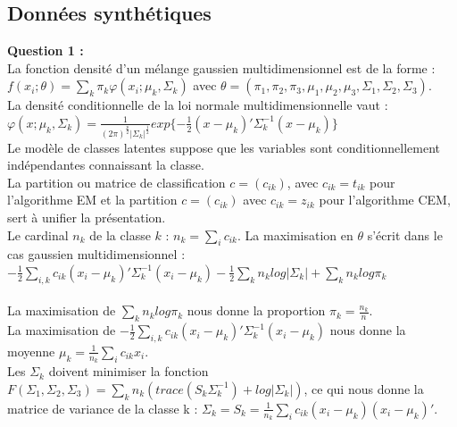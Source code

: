 \documentclass[a4paper, 10pt]{article}
\begin{document}
\subsection*{Données synthétiques}
\textbf{Question 1 :}\\
La fonction densité d'un mélange gaussien multidimensionnel est de la forme :\\
$f(x_{i}; \theta) = \underset{k}{\sum} \pi_{k} \varphi (x_{i}; \mu_{k}, \Sigma_{k})$ avec 
$\theta = (\pi_{1}, \pi_{2}, \pi_{3}, \mu_{1}, \mu_{2}, \mu_{3}, \Sigma_{1}, \Sigma_{2}, \Sigma_{3})$.\\
La densité conditionnelle de la loi normale multidimensionnelle vaut :\\
$\varphi(x; \mu_{k}, \Sigma_{k}) = \frac{1}{(2 \pi)^{\frac{p}{2}}|\Sigma_{k}|^\frac{1}{2}}
exp\{-\frac{1}{2} (x - \mu_{k})' \Sigma_{k}^{-1} (x - \mu_{k})\}$ \\
Le modèle de classes latentes suppose que les variables sont conditionnellement indépendantes connaissant la classe.\\
La partition ou matrice de classification $c = (c_{ik})$, avec $c_{ik} = t_{ik}$ pour l'algorithme EM et
la partition $c = (c_{ik})$ avec $c_{ik} = z_{ik}$ pour l'algorithme CEM, sert à unifier la présentation.\\
Le cardinal $n_{k}$ de la classe $k$ : $n_{k} = \sum_{i} c_{ik}$.
\newpage
\noindent
La maximisation en $\theta$ s'écrit dans le cas gaussien multidimensionnel :\\
$-\frac{1}{2} \underset{i, k}{\sum} c_{ik} (x_{i} - \mu_{k})' \Sigma_{k}^{-1} (x_{i} - \mu_{k})
- \frac{1}{2} \underset{k}{\sum} n_{k} log|\Sigma_{k}| + \underset{k}{\sum} n_{k} log \pi_{k}$\\ \\
La maximisation de $\underset{k}{\sum} n_{k} log \pi_{k}$ nous donne la proportion $\pi_{k} = \frac{n_{k}}{n}$.\\
La maximisation de $-\frac{1}{2} \sum_{i,k} c_{ik} (x_{i} - \mu_{k})' \Sigma_{k}^{-1} (x_{i} - \mu_{k})$ nous donne la moyenne
$\mu_{k} = \frac{1}{n_{k}} \underset{i}{\sum} c_{ik} x_{i}$.\\
Les $\Sigma_{k}$ doivent minimiser la fonction $F(\Sigma_{1}, \Sigma_{2}, \Sigma_{3}) =
\underset{k}{\sum} n_{k} (trace(S_{k} \Sigma_{k}^{-1}) + log|\Sigma_{k}|)$,
ce qui nous donne la matrice de variance de la classe k : 
$\Sigma_{k} = S_{k} = \frac{1}{n_{k}} \sum_{i} c_{ik} (x_{i} - \mu_{k}) (x_{i} - \mu_{k})'$.\\ \\
\end{document}
